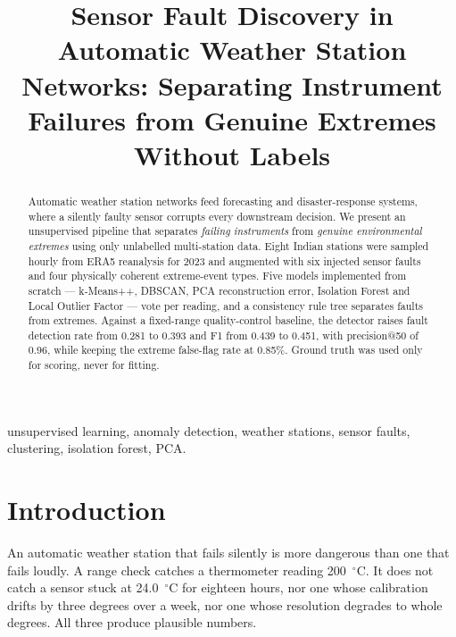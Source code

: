 \documentclass[conference]{IEEEtran}
\begin{document}
\title{Sensor Fault Discovery in Automatic Weather Station Networks:
Separating Instrument Failures from Genuine Extremes Without Labels}

\author{
}

\maketitle

\begin{abstract}
Automatic weather station networks feed forecasting and disaster-response systems, where a silently
faulty sensor corrupts every downstream decision. We present an unsupervised pipeline that separates
\emph{failing instruments} from \emph{genuine environmental extremes} using only unlabelled
multi-station data. Eight Indian stations were sampled hourly from ERA5 reanalysis for 2023 and
augmented with six injected sensor faults and four physically coherent extreme-event types. Five
models implemented from scratch --- k-Means++, DBSCAN, PCA reconstruction error, Isolation Forest and
Local Outlier Factor --- vote per reading, and a consistency rule tree separates faults from
extremes. Against a fixed-range quality-control baseline, the detector raises fault detection rate
from 0.281 to 0.393 and F1 from 0.439 to 0.451, with precision@50 of 0.96, while keeping the
extreme false-flag rate at 0.85\%. Ground truth was used only for scoring, never for fitting.
\end{abstract}

\begin{IEEEkeywords}
unsupervised learning, anomaly detection, weather stations, sensor faults, clustering,
isolation forest, PCA.
\end{IEEEkeywords}

\section{Introduction}
An automatic weather station that fails silently is more dangerous than one that fails loudly. A
range check catches a thermometer reading 200~$^\circ$C. It does not catch a sensor stuck at
24.0~$^\circ$C for eighteen hours, nor one whose calibration drifts by three degrees over a week,
nor one whose resolution degrades to whole degrees. All three produce plausible numbers.
\end{document}
